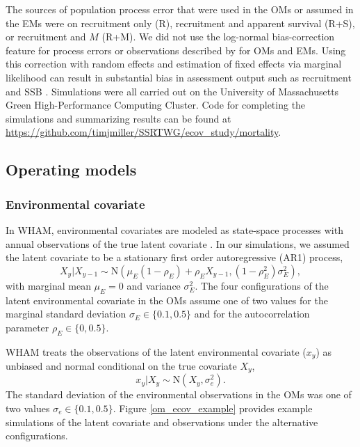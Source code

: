 \documentclass[
  12pt,
]{article}
\begin{document}
The sources of population process error that were used in the OMs or assumed in the EMs were on recruitment only (R), recruitment and apparent survival (R+S), or recruitment and \(M\) (R+M). We did not use the log-normal bias-correction feature for process errors or observations described by \citet{stockmiller21} for OMs and EMs. Using this correction with random effects and estimation of fixed effects via marginal likelihood can result in substantial bias in assessment output such as recruitment and SSB \citep{lietal26}. Simulations were all carried out on the University of Massachusetts Green High-Performance Computing Cluster. Code for completing the simulations and summarizing results can be found at \url{https://github.com/timjmiller/SSRTWG/ecov_study/mortality}.

\subsection*{Operating models}\label{operating-models}

\subsubsection*{Environmental covariate}\label{environmental-covariate}

In WHAM, environmental covariates are modeled as state-space processes with annual observations of the true latent covariate \citep{milleretal16, stockmiller21}. In our simulations, we assumed the latent covariate to be a stationary first order autoregressive (AR1) process,
\[
X_y|X_{y-1} \sim \text{N}\left(\mu_E\left(1-\rho_E\right) + \rho_E X_{y-1}, \left(1-\rho_E^2\right)\sigma^2_E\right),
\]
with marginal mean \(\mu_E=0\) and variance \(\sigma^2_E\). The four configurations of the latent environmental covariate in the OMs assume one of two values for the marginal standard deviation \(\sigma_E \in \{0.1, 0.5\}\) and for the autocorrelation parameter \(\rho_E \in \{0, 0.5\}\).

WHAM treats the observations of the latent environmental covariate (\(x_y\)) as unbiased and normal conditional on the true covariate \(X_y\),
\[
x_y|X_y \sim \text{N}\left(X_y,\sigma^2_e\right).
\]
The standard deviation of the environmental observations in the OMs was one of two values \(\sigma_e \in \{0.1, 0.5\}\). Figure \ref{om_ecov_example} provides example simulations of the latent covariate and observations under the alternative configurations.
\end{document}
